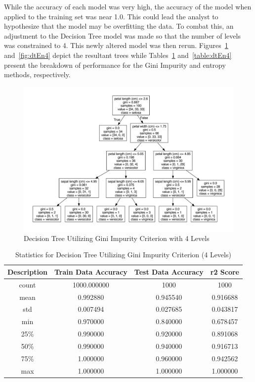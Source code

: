 \documentclass[journal]{IEEEtran}
\begin{document}
While the accuracy of each model was very high, the accuracy of the model when applied to the training set was near 1.0. This could lead the analyst to hypothesize that the model may be overfitting the data. To combat this, an adjustment to the Decision Tree model was made so that the number of levels was constrained to 4. This newly altered model was then rerun. Figures~\ref{fig:dtGI4} and~\ref{fig:dtEn4} depict the resultant trees while Tables~\ref{table:dtGI4} and~\ref{table:dtEn4} present the breakdown of performance for the Gini Impurity and entropy methods, respectively. 

\begin{figure}[h!]
\includegraphics[scale=0.25]{iris-gini-4levels.pdf}
\centering
\caption{Decision Tree Utilizing Gini Impurity Criterion with 4 Levels}
\label{fig:dtGI4}
\end{figure}

\vspace{20px}

\begin{table}[h!]
\centering
\begin{tabular}{ c | c c c }
    Description & Train Data Accuracy & Test Data Accuracy & r2 Score \\ 
\hline
count     &     1000.000000     &    1000 & 1000\\
mean      &        0.992880     &       0.945540  &   0.916688\\
std       &        0.007494     &       0.027685  &   0.043817\\
min       &        0.970000     &       0.840000  &   0.678457\\
25\%      &         0.990000    &        0.920000 &    0.891068\\
50\%      &         0.990000    &        0.940000 &    0.916713\\
75\%      &         1.000000    &        0.960000 &    0.942562\\
max       &        1.000000     &       1.000000  &   1.000000
\end{tabular}
\caption{Statistics for Decision Tree Utilizing Gini Impurity Criterion (4 Levels)}
\label{table:dtGI4}
\end{table}
\end{document}
